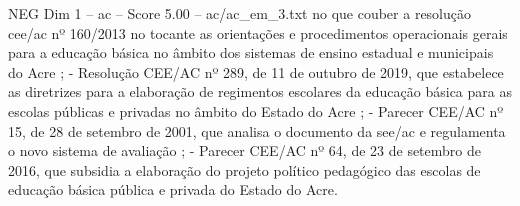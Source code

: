 \begin{textsample}{NEG Dim 1 – ac – Score 5.00 – ac/ac\_em\_3.txt}
no que couber a resolução cee/ac nº 160/2013 no tocante as orientações e procedimentos operacionais gerais para a educação básica no âmbito dos sistemas de ensino estadual e municipais do Acre ; - Resolução CEE/AC nº 289, de 11 de outubro de 2019, que estabelece as diretrizes para a elaboração de regimentos escolares da educação básica para as escolas públicas e privadas no âmbito do Estado do Acre ; - Parecer CEE/AC nº 15, de 28 de setembro de 2001, que analisa o documento da see/ac e regulamenta o novo sistema de avaliação ; - Parecer CEE/AC nº 64, de 23 de setembro de 2016, que subsidia a elaboração do projeto político pedagógico das escolas de educação básica pública e privada do Estado do Acre.

\end{textsample}
